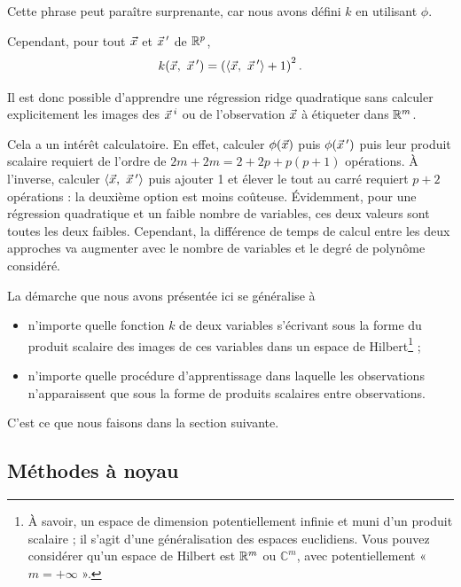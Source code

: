 Cette phrase peut paraître surprenante, car nous avons défini $k$ en utilisant $\phi$.

Cependant, pour tout $\xx$ et $\xx^\prime$ de $\mathbb{R}^p$,
\begin{equation*}
  k(\xx,~\xx^\prime) = \left(\innerproduct{\xx,~\xx^\prime} + 1 \right)^2.
\end{equation*}

Il est donc possible d'apprendre une régression ridge quadratique sans calculer
explicitement les images des $\xx^i$ ou de l'observation $\xx$ à étiqueter dans
$\mathbb{R}^m$.

Cela a un intérêt calculatoire. En effet, calculer $\phi(\xx)$ puis
$\phi(\xx^\prime)$ puis leur produit scalaire requiert de l'ordre de
$2m + 2m = 2 + 2p + p(p+1)$ opérations. À l'inverse, calculer
$\innerproduct{\xx,~\xx^\prime}$ puis ajouter 1 et élever le tout au carré
requiert $p+2$ opérations : la deuxième option est moins coûteuse. Évidemment,
pour une régression quadratique et un faible nombre de variables, ces deux
valeurs sont toutes les deux faibles. Cependant, la différence de temps de calcul entre les deux approches va augmenter avec le nombre de variables et le degré de polynôme considéré.

La démarche que nous avons présentée ici se généralise à
\begin{itemize}
\item n'importe quelle fonction $k$ de deux variables s'écrivant sous la forme
  du produit scalaire des images de ces variables dans un espace de
  Hilbert\footnote{À savoir, un espace de dimension potentiellement infinie et
    muni d'un produit scalaire ; il s'agit d'une généralisation des espaces
    euclidiens. Vous pouvez considérer qu'un espace de Hilbert est $\mathbb{R}^m$ ou
    $\mathbb{C}^m$, avec potentiellement « $m = +\infty$ ».} ;
\item n'importe quelle procédure d'apprentissage dans laquelle les observations
  n'apparaissent que sous la forme de produits scalaires entre observations.
\end{itemize}
C'est ce que nous faisons dans la section suivante.

\subsection{Méthodes à noyau}
\label{sec:kernels}

